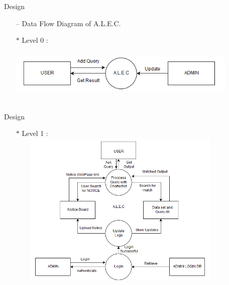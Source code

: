 \documentclass{beamer}
\begin{document}
\begin{frame}{Design}
    \begin{itemize}
        \item[--] Data Flow Diagram of A.L.E.C.
        \linebreak
        \item[$\ast$] Level 0 :
        \includegraphics[width=11cm, height=3cm]{Level1_DFD.PNG}
    \end{itemize}
\end{frame}

\begin{frame}{Design}
   \begin{itemize}
       \item[$\ast$] Level 1 :
        \includegraphics[width=11cm, height=7.5cm]{Level2_DFD.PNG}      
   \end{itemize}
    
\end{frame}
\end{document}
